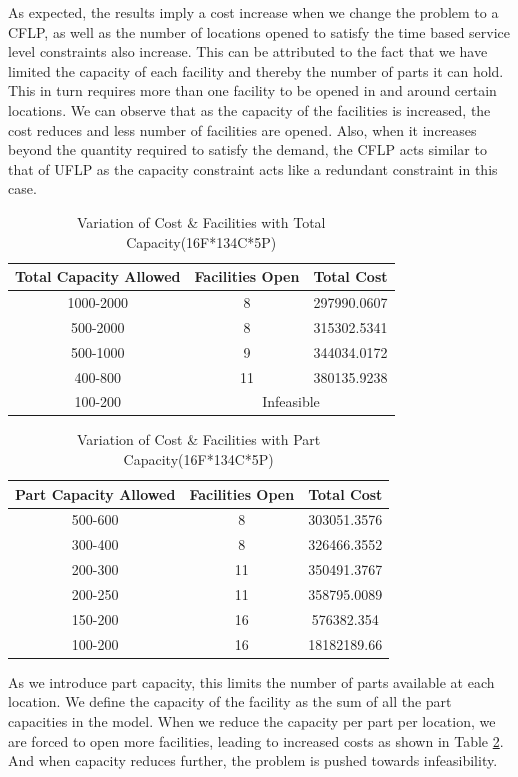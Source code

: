 \documentclass[12pt]{article}
\numberwithin{equation}{section}
\begin{document}
As expected, the results imply a cost increase when we change the problem to a CFLP, as well as the number of locations opened to satisfy the time based service level constraints also increase. This can be attributed to the fact that we have limited the capacity of each facility and thereby the number of parts it can hold. This in turn requires more than one facility to be opened in and around certain locations. We can observe that as the capacity of the facilities is increased, the cost reduces and less number of facilities are opened. Also, when it increases beyond the quantity required to satisfy the demand, the CFLP acts similar to that of UFLP as the capacity constraint acts like a redundant constraint in this case.\\
\begin{table}[H]
\centering
\caption{Variation of Cost \& Facilities with Total Capacity(16F*134C*5P)}
\label{capacity}
\begin{tabular}{|c|c|c|}
\hline
\textbf{Total Capacity Allowed} & \textbf{Facilities Open} & \textbf{Total Cost} \\ \hline
1000-2000 & 8 & 297990.0607 \\ \hline
500-2000 & 8 & 315302.5341 \\ \hline
500-1000 & 9 & 344034.0172 \\ \hline
400-800 & 11 & 380135.9238 \\ \hline
100-200 & \multicolumn{2}{c|}{Infeasible} \\ \hline
\end{tabular}
\end{table}
\begin{table}[H]
\centering
\caption{Variation of Cost \& Facilities with Part Capacity(16F*134C*5P)}
\label{parts}
\begin{tabular}{|c|c|c|}
\hline
\textbf{Part Capacity Allowed} & \textbf{Facilities Open} & \textbf{Total Cost} \\ \hline
500-600 & 8 & 303051.3576 \\ \hline
300-400 & 8 & 326466.3552 \\ \hline
200-300 & 11 & 350491.3767 \\ \hline
200-250 & 11 & 358795.0089 \\ \hline
150-200 & 16 & 576382.354 \\ \hline
100-200 & 16 & 18182189.66 \\ \hline
\end{tabular}
\end{table}
As we introduce part capacity, this limits the number of parts available at each location. We define the capacity of the facility as the sum of all the part capacities in the model. When we reduce the capacity per part per location, we are forced to open more facilities, leading to increased costs as shown in Table \ref{parts}. And when capacity reduces further, the problem is pushed towards infeasibility.\\
\end{document}

